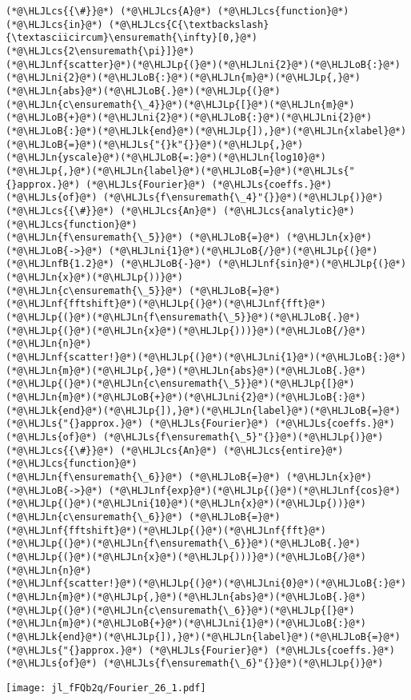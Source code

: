 \documentclass[12pt,a4paper]{article}
\newcommand{\HLJLk}[1]{\textcolor[RGB]{148,91,176}{\textbf{#1}}}
\newcommand{\HLJLn}[1]{#1}
\newcommand{\HLJLnf}[1]{\textcolor[RGB]{66,102,213}{#1}}
\newcommand{\HLJLs}[1]{\textcolor[RGB]{201,61,57}{#1}}
\newcommand{\HLJLnfB}[1]{\textcolor[RGB]{59,151,46}{#1}}
\newcommand{\HLJLni}[1]{\textcolor[RGB]{59,151,46}{#1}}
\newcommand{\HLJLoB}[1]{\textcolor[RGB]{102,102,102}{\textbf{#1}}}
\newcommand{\HLJLp}[1]{#1}
\newcommand{\HLJLcs}[1]{\textcolor[RGB]{153,153,119}{\textit{#1}}}
\begin{document}
\begin{lstlisting}
(*@\HLJLcs{{\#}}@*) (*@\HLJLcs{A}@*) (*@\HLJLcs{function}@*) (*@\HLJLcs{in}@*) (*@\HLJLcs{C{\textbackslash}{\textasciicircum}\ensuremath{\infty}[0,}@*) (*@\HLJLcs{2\ensuremath{\pi}]}@*)
(*@\HLJLnf{scatter}@*)(*@\HLJLp{(}@*)(*@\HLJLni{2}@*)(*@\HLJLoB{:}@*)(*@\HLJLni{2}@*)(*@\HLJLoB{:}@*)(*@\HLJLn{m}@*)(*@\HLJLp{,}@*)(*@\HLJLn{abs}@*)(*@\HLJLoB{.}@*)(*@\HLJLp{(}@*)(*@\HLJLn{c\ensuremath{\_4}}@*)(*@\HLJLp{[}@*)(*@\HLJLn{m}@*)(*@\HLJLoB{+}@*)(*@\HLJLni{2}@*)(*@\HLJLoB{:}@*)(*@\HLJLni{2}@*)(*@\HLJLoB{:}@*)(*@\HLJLk{end}@*)(*@\HLJLp{]),}@*)(*@\HLJLn{xlabel}@*)(*@\HLJLoB{=}@*)(*@\HLJLs{"{}k"{}}@*)(*@\HLJLp{,}@*)
(*@\HLJLn{yscale}@*)(*@\HLJLoB{=:}@*)(*@\HLJLn{log10}@*)(*@\HLJLp{,}@*)(*@\HLJLn{label}@*)(*@\HLJLoB{=}@*)(*@\HLJLs{"{}approx.}@*) (*@\HLJLs{Fourier}@*) (*@\HLJLs{coeffs.}@*) (*@\HLJLs{of}@*) (*@\HLJLs{f\ensuremath{\_4}"{}}@*)(*@\HLJLp{)}@*)
(*@\HLJLcs{{\#}}@*) (*@\HLJLcs{An}@*) (*@\HLJLcs{analytic}@*) (*@\HLJLcs{function}@*)
(*@\HLJLn{f\ensuremath{\_5}}@*) (*@\HLJLoB{=}@*) (*@\HLJLn{x}@*) (*@\HLJLoB{->}@*) (*@\HLJLni{1}@*)(*@\HLJLoB{/}@*)(*@\HLJLp{(}@*)(*@\HLJLnfB{1.2}@*) (*@\HLJLoB{-}@*) (*@\HLJLnf{sin}@*)(*@\HLJLp{(}@*)(*@\HLJLn{x}@*)(*@\HLJLp{))}@*)
(*@\HLJLn{c\ensuremath{\_5}}@*) (*@\HLJLoB{=}@*) (*@\HLJLnf{fftshift}@*)(*@\HLJLp{(}@*)(*@\HLJLnf{fft}@*)(*@\HLJLp{(}@*)(*@\HLJLn{f\ensuremath{\_5}}@*)(*@\HLJLoB{.}@*)(*@\HLJLp{(}@*)(*@\HLJLn{x}@*)(*@\HLJLp{)))}@*)(*@\HLJLoB{/}@*)(*@\HLJLn{n}@*)
(*@\HLJLnf{scatter!}@*)(*@\HLJLp{(}@*)(*@\HLJLni{1}@*)(*@\HLJLoB{:}@*)(*@\HLJLn{m}@*)(*@\HLJLp{,}@*)(*@\HLJLn{abs}@*)(*@\HLJLoB{.}@*)(*@\HLJLp{(}@*)(*@\HLJLn{c\ensuremath{\_5}}@*)(*@\HLJLp{[}@*)(*@\HLJLn{m}@*)(*@\HLJLoB{+}@*)(*@\HLJLni{2}@*)(*@\HLJLoB{:}@*)(*@\HLJLk{end}@*)(*@\HLJLp{]),}@*)(*@\HLJLn{label}@*)(*@\HLJLoB{=}@*)(*@\HLJLs{"{}approx.}@*) (*@\HLJLs{Fourier}@*) (*@\HLJLs{coeffs.}@*) (*@\HLJLs{of}@*) (*@\HLJLs{f\ensuremath{\_5}"{}}@*)(*@\HLJLp{)}@*)
(*@\HLJLcs{{\#}}@*) (*@\HLJLcs{An}@*) (*@\HLJLcs{entire}@*) (*@\HLJLcs{function}@*)
(*@\HLJLn{f\ensuremath{\_6}}@*) (*@\HLJLoB{=}@*) (*@\HLJLn{x}@*) (*@\HLJLoB{->}@*) (*@\HLJLnf{exp}@*)(*@\HLJLp{(}@*)(*@\HLJLnf{cos}@*)(*@\HLJLp{(}@*)(*@\HLJLni{10}@*)(*@\HLJLn{x}@*)(*@\HLJLp{))}@*)
(*@\HLJLn{c\ensuremath{\_6}}@*) (*@\HLJLoB{=}@*) (*@\HLJLnf{fftshift}@*)(*@\HLJLp{(}@*)(*@\HLJLnf{fft}@*)(*@\HLJLp{(}@*)(*@\HLJLn{f\ensuremath{\_6}}@*)(*@\HLJLoB{.}@*)(*@\HLJLp{(}@*)(*@\HLJLn{x}@*)(*@\HLJLp{)))}@*)(*@\HLJLoB{/}@*)(*@\HLJLn{n}@*)
(*@\HLJLnf{scatter!}@*)(*@\HLJLp{(}@*)(*@\HLJLni{0}@*)(*@\HLJLoB{:}@*)(*@\HLJLn{m}@*)(*@\HLJLp{,}@*)(*@\HLJLn{abs}@*)(*@\HLJLoB{.}@*)(*@\HLJLp{(}@*)(*@\HLJLn{c\ensuremath{\_6}}@*)(*@\HLJLp{[}@*)(*@\HLJLn{m}@*)(*@\HLJLoB{+}@*)(*@\HLJLni{1}@*)(*@\HLJLoB{:}@*)(*@\HLJLk{end}@*)(*@\HLJLp{]),}@*)(*@\HLJLn{label}@*)(*@\HLJLoB{=}@*)(*@\HLJLs{"{}approx.}@*) (*@\HLJLs{Fourier}@*) (*@\HLJLs{coeffs.}@*) (*@\HLJLs{of}@*) (*@\HLJLs{f\ensuremath{\_6}"{}}@*)(*@\HLJLp{)}@*)
\end{lstlisting}

\texttt{[image: jl\_fFQb2q/Fourier\_26\_1.pdf]}
\end{document}

